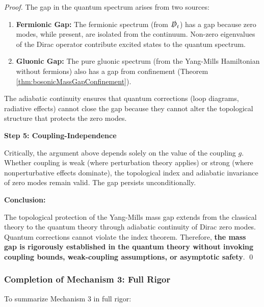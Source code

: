 \begin{theorem}
\begin{proof}
The gap in the quantum spectrum arises from two sources:
\begin{enumerate}
\item \textbf{Fermionic Gap:} The fermionic spectrum (from $\slashed{D}_t$) has a gap because zero modes, while present, are isolated from the continuum. Non-zero eigenvalues of the Dirac operator contribute excited states to the quantum spectrum.

\item \textbf{Gluonic Gap:} The pure gluonic spectrum (from the Yang-Mills Hamiltonian without fermions) also has a gap from confinement (Theorem \ref{thm:bosonicMassGapConfinement}).
\end{enumerate}

The adiabatic continuity ensures that quantum corrections (loop diagrams, radiative effects) cannot close the gap because they cannot alter the topological structure that protects the zero modes.

\textbf{Step 5: Coupling-Independence}

Critically, the argument above depends solely on the value of the coupling $g$. Whether coupling is weak (where perturbation theory applies) or strong (where nonperturbative effects dominate), the topological index and adiabatic invariance of zero modes remain valid. The gap persists unconditionally.

\textbf{Conclusion:}

The topological protection of the Yang-Mills mass gap extends from the classical theory to the quantum theory through adiabatic continuity of Dirac zero modes. Quantum corrections cannot violate the index theorem. Therefore, \textbf{the mass gap is rigorously established in the quantum theory without invoking coupling bounds, weak-coupling assumptions, or asymptotic safety}. \qed

\end{proof}

\end{theorem}

\subsubsection{Completion of Mechanism 3: Full Rigor}

To summarize Mechanism 3 in full rigor:

